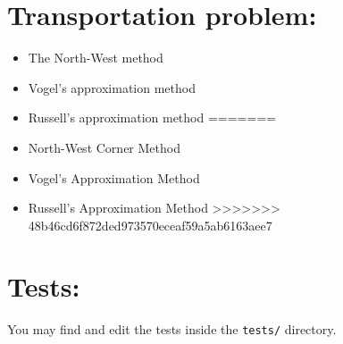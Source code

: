 \documentclass{article}
\begin{document}
\section*{Transportation problem:}

\begin{itemize}
<<<<<<< HEAD
\item The North-West method
\item Vogel’s approximation method
\item  Russell’s approximation method
=======
    \item North-West Corner Method
    \item Vogel's Approximation Method
    \item Russell's Approximation Method
>>>>>>> 48b46cd6f872ded973570eceaf59a5ab6163aee7
\end{itemize}

\newpage

\section*{Tests:}

You may find and edit the tests inside the \texttt{tests/} directory.
\end{document}
